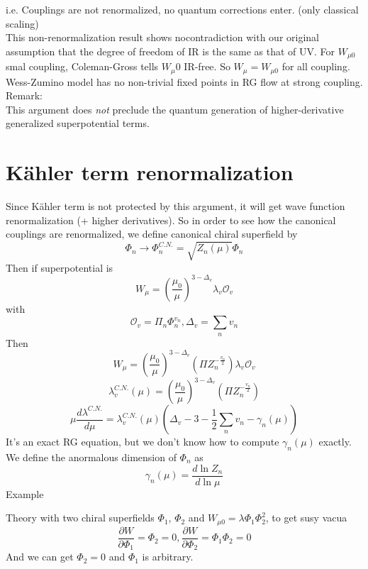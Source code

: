 \documentclass[type = bachelor]{fduthesis-en}
\begin{document}
i.e. Couplings are not renormalized, no quantum corrections enter. (only classical scaling)\\
This non-renormalization result shows nocontradiction with our original assumption that the degree of freedom of IR is the same as that of UV. For $W_{\mu0}$ smal coupling, Coleman-Gross tells $W_\mu0$ IR-free. So $W_\mu=W_{\mu0}$ for all coupling. Wess-Zumino model has no non-trivial fixed points in RG flow at strong coupling.\\
Remark:\\
This argument does \emph{not} preclude the quantum generation of higher-derivative generalized superpotential terms.
\section{K\"{a}hler term renormalization}
Since K\"{a}hler term is not protected by this argument, it will get wave function renormalization (+ higher derivatives). So in order to see how the canonical couplings are renormalized, we define canonical chiral superfield by
\begin{equation}
\Phi_n\rightarrow\Phi_n^{C.N.}=\sqrt{Z_n(\mu)}\Phi_n
\end{equation}
Then if superpotential is
\begin{equation}
W_\mu=(\frac{\mu_0}{\mu})^{3-\Delta_v}\lambda_v\mathcal{O}_v
\end{equation}
with
\begin{equation}
\mathcal{O}_v=\Pi_n\Phi_n^{v_n}, \Delta_v=\sum_nv_n
\end{equation}
Then
\begin{equation}
W_\mu=(\frac{\mu_0}{\mu})^{3-\Delta_v}(\Pi Z_n^{-\frac{v_n}{2}})\lambda_v\mathcal{O}_v
\end{equation}
\begin{equation}
\lambda_v^{C.N.}(\mu)=(\frac{\mu_0}{\mu})^{3-\Delta_v}(\Pi Z_n^{-\frac{v_n}{2}})
\end{equation}
\begin{equation}
\mu\frac{d\lambda^{C.N.}}{d\mu}=\lambda_v^{C.N.}(\mu)(\Delta_v-3-\frac{1}{2}\sum_nv_n-\gamma_n(\mu))
\end{equation}
It's an exact RG equation, but we don't know how to compute $\gamma_n(\mu)$ exactly.
We define the anormalous dimension of $\Phi_n$ as 
\begin{equation}
\gamma_n(\mu)=\frac{d\ln Z_n}{d\ln\mu}
\end{equation}
Example

Theory with two chiral superfields $\Phi_1$, $\Phi_2$ and $W_{\mu0}=\lambda\Phi_1\Phi_2^2$, to get susy vacua
\begin{equation}
\frac{\partial W}{\partial\Phi_1}=\Phi_2=0, \frac{\partial W}{\partial\Phi_2}=\Phi_1\Phi_2=0
\end{equation}
And we can get $\Phi_2=0$ and $\Phi_1$ is arbitrary.
\end{document}
